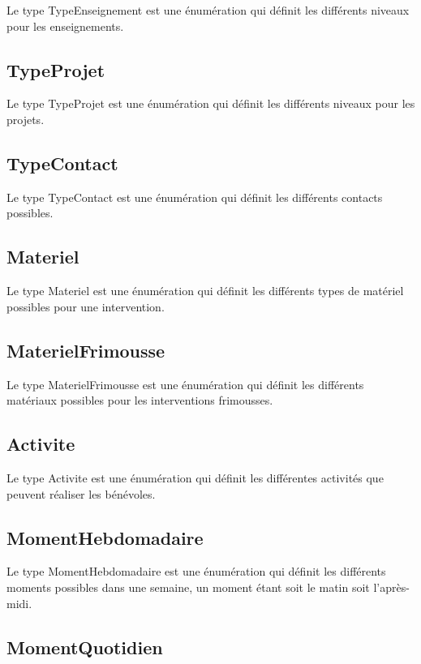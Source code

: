 \documentclass[asi, sansVersion]{picInsa}
\begin{document}
Le type TypeEnseignement est une énumération qui définit les différents niveaux pour les enseignements.

\subsection*{TypeProjet}

Le type TypeProjet est une énumération qui définit les différents niveaux pour les projets.

\subsection*{TypeContact}

Le type TypeContact est une énumération qui définit les différents contacts possibles.

\subsection*{Materiel}

Le type Materiel est une énumération qui définit les différents types de matériel possibles pour une intervention.

\subsection*{MaterielFrimousse}

Le type MaterielFrimousse est une énumération qui définit les différents matériaux possibles pour les interventions frimousses.

\subsection*{Activite}

Le type Activite est une énumération qui définit les différentes activités que peuvent réaliser les bénévoles.

\subsection*{MomentHebdomadaire}

Le type MomentHebdomadaire est une énumération qui définit les différents moments possibles dans une semaine, un moment étant soit le matin soit l'après-midi.

\subsection*{MomentQuotidien}
\end{document}
